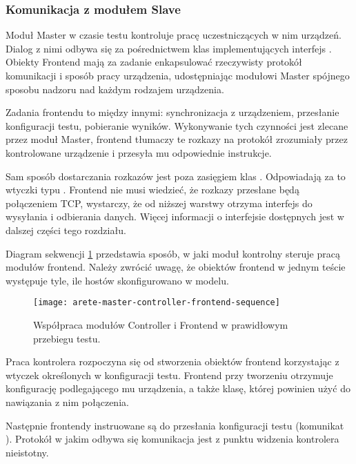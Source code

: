 \documentclass[00-praca-magisterska.tex]{subfiles}
\begin{document}
\subsubsection{Komunikacja z modułem Slave}

Moduł Master w czasie testu kontroluje pracę uczestniczących w nim urządzeń.
Dialog z nimi odbywa się za pośrednictwem klas implementujących interfejs
. Obiekty Frontend mają za zadanie enkapsulować rzeczywisty
protokół komunikacji i sposób pracy urządzenia, udostępniając modułowi Master
spójnego sposobu nadzoru nad każdym rodzajem urządzenia.

Zadania frontendu to między innymi: synchronizacja z urządzeniem, przesłanie
konfiguracji testu, pobieranie wyników. Wykonywanie tych czynności jest zlecane
przez moduł Master, frontend tłumaczy te rozkazy na protokół zrozumiały przez
kontrolowane urządzenie i przesyła mu odpowiednie instrukcje.

Sam sposób dostarczania rozkazów jest poza zasięgiem klas .
Odpowiadają za to wtyczki typu . Frontend nie musi
wiedzieć, że rozkazy przesłane będą połączeniem TCP, wystarczy, że od niższej
warstwy otrzyma interfejs do wysyłania i odbierania danych. Więcej informacji o
interfejsie  dostępnych jest w dalszej części tego
rozdziału.

Diagram sekwencji \ref{fig:arete-master-controller-frontend-sequence}
przedstawia sposób, w jaki moduł kontrolny steruje pracą modułów frontend.
Należy zwrócić uwagę, że obiektów frontend w jednym teście występuje tyle, ile
hostów skonfigurowano w modelu.

\begin{figure}[htb]
\begin{center}
\leavevmode
\texttt{[image: arete-master-controller-frontend-sequence]}
\end{center}
\caption{Współpraca modułów Controller i Frontend w prawidłowym przebiegu testu.}
\label{fig:arete-master-controller-frontend-sequence}
\end{figure}

Praca kontrolera rozpoczyna się od stworzenia obiektów frontend korzystając z
wtyczek określonych w konfiguracji testu. Frontend przy tworzeniu otrzymuje
konfigurację podlegającego mu urządzenia, a także klasę, której powinien użyć
do nawiązania z nim połączenia.

Następnie frontendy instruowane są do przesłania konfiguracji testu (komunikat
). Protokół w jakim odbywa się komunikacja jest z
punktu widzenia kontrolera nieistotny.
\end{document}
